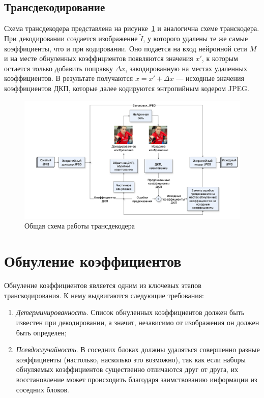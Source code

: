 \documentclass[times,specification,annotation]{itmo-student-thesis}
\begin{document}
\subsection{Трансдекодирование}\label{subsection:transdecoding-overview}

Схема трансдекодера представлена на рисунке~\ref{decoder-scheme} и аналогична схеме транскодера. При декодировании создается изображение $\tilde{I}$, у которого удалены те же самые коэффициенты, что и при кодировании. Оно подается на вход нейронной сети $M$ и на месте обнуленных коэффициентов появляются значения $x'$, к которым остается только добавить поправку $\Delta x$, закодированную на местах удаленных коэффициентов. В результате получаются $x = x' + \Delta x$ --- исходные значения коэффициентов ДКП, которые далее кодируются энтропийным кодером JPEG.

\begin{figure}[!h]
    \centering
    \includegraphics[width=\textwidth]{./images/decoder-scheme.png}
    \caption{Общая схема работы трансдекодера}
    \label{decoder-scheme}
\end{figure}

\section{Обнуление коэффициентов}\label{section:zeroing-the-coefficients}

Обнуление коэффициентов является одним из ключевых этапов транскодирования. К нему выдвигаются следующие требования:
\begin{enumerate}
    \item \textit{Детерминированность}. Список обнуленных коэффициентов должен быть известен при декодировании, а значит, независимо от изображения он должен быть определен;
    \item \textit{Псевдослучайность}. В соседних блоках должны удаляться совершенно разные коэффициенты (настолько, насколько это возможно), так как если наборы обнуляемых коэффициентов существенно отличаются друг от друга, их восстановление может происходить благодаря заимствованию информации из соседних блоков.
\end{enumerate}
\end{document}
